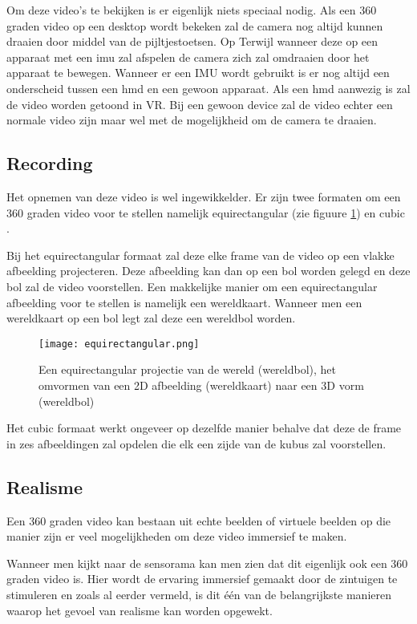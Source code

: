 Om deze video's te bekijken is er eigenlijk niets speciaal nodig. Als een 360 graden video op een desktop wordt bekeken zal de camera nog altijd kunnen draaien door middel van de pijltjestoetsen. Op Terwijl wanneer deze op een apparaat met een \acrshort{imu} zal afspelen de camera zich zal omdraaien door het apparaat te bewegen. Wanneer er een IMU wordt gebruikt is er nog altijd een onderscheid tussen een \acrshort{hmd} en een gewoon apparaat. Als een \acrshort{hmd} aanwezig is zal de video worden getoond in VR. Bij een gewoon device zal de video echter een normale video zijn maar wel met de mogelijkheid om de camera te draaien.

\subsection{Recording}
Het opnemen van deze video is wel ingewikkelder. Er zijn twee formaten om een 360 graden video voor te stellen namelijk equirectangular (zie figuure \ref{fig:equirectangularprojection}) en cubic \autocite{Lee2010}. 

Bij het equirectangular formaat zal deze elke frame van de video op een vlakke afbeelding projecteren. Deze afbeelding kan dan op een bol worden gelegd en deze bol zal de video voorstellen. Een makkelijke manier om een equirectangular afbeelding voor te stellen is namelijk een wereldkaart. Wanneer men een wereldkaart op een bol legt zal deze een wereldbol worden.
 
\begin{figure}
    \texttt{[image: equirectangular.png]}
    \caption{Een equirectangular projectie van de wereld (wereldbol), het omvormen van een 2D afbeelding (wereldkaart) naar een 3D vorm (wereldbol)}
    \label{fig:equirectangularprojection}
\end{figure}

Het cubic formaat werkt ongeveer op dezelfde manier behalve dat deze de frame in zes afbeeldingen zal opdelen die elk een zijde van de kubus zal voorstellen.

\subsection{Realisme}
Een 360 graden video kan bestaan uit echte beelden of virtuele beelden op die manier zijn er veel mogelijkheden om deze video immersief te maken. 

Wanneer men kijkt naar de sensorama kan men zien dat dit eigenlijk ook een 360 graden video is. Hier wordt de ervaring immersief gemaakt door de zintuigen te stimuleren en zoals al eerder vermeld, is dit één van de belangrijkste manieren waarop het gevoel van realisme kan worden opgewekt.

